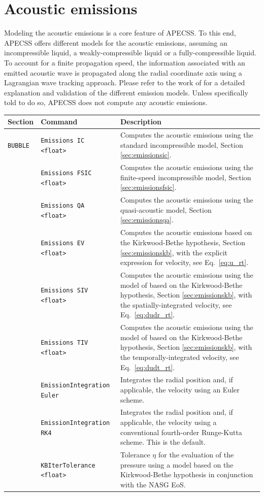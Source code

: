 \chapter{Acoustic emissions}

Modeling the acoustic emissions is a core feature of APECSS. To this end, APECSS offers different models for the acoustic emissions, assuming an incompressible liquid, a weakly-compressible liquid or a fully-compressible liquid. To account for a finite propagation speed, the information associated with an emitted acoustic wave is propagated along the radial coordinate axis using a Lagrangian wave tracking approach. Please refer to the work of \citet{Denner2023} for a detailed explanation and validation of the different emission models. Unless specifically told to do so, APECSS does not compute any acoustic emissions. 

\vspace{0.8em}

\noindent
\begin{tabular}{p{} p{} p{}}
    \textbf{Section} &\textbf{Command} & \textbf{Description} 
\vspace{1mm} \\ \hline
{\tt BUBBLE} & {\tt Emissions IC <float>} & Computes the acoustic emissions using the standard incompressible model, Section \ref{sec:emissionsic}.\\ 
& {\tt Emissions FSIC <float>} & Computes the acoustic emissions using the finite-speed incompressible model, Section \ref{sec:emissionsfsic}.\\ 
& {\tt Emissions QA <float>} & Computes the acoustic emissions using the quasi-acoustic model, Section \ref{sec:emissionsqa}.\\ 
& {\tt Emissions EV <float>} & Computes the acoustic emissions based on the Kirkwood-Bethe hypothesis, Section \ref{sec:emissionskb}, with the explicit expression for velocity, see Eq.~\eqref{eq:u_rt}.\\ 
& {\tt Emissions SIV <float>} & Computes the acoustic emissions using the model of \citet{Gilmore1952} based on the Kirkwood-Bethe hypothesis, Section \ref{sec:emissionskb}, with the spatially-integrated velocity, see Eq.~\eqref{eq:dudr_rt}.\\ 
& {\tt Emissions TIV <float>} & Computes the acoustic emissions using the model of \citet{Hickling1963} based on the Kirkwood-Bethe hypothesis, Section \ref{sec:emissionskb}, with the temporally-integrated velocity, see Eq.~\eqref{eq:dudt_rt}.\\ 
& {\tt EmissionIntegration Euler} & Integrates the radial position and, if applicable, the velocity using an Euler scheme.\\
& {\tt EmissionIntegration RK4} & Integrates the radial position and, if applicable, the velocity using a conventional fourth-order Runge-Kutta scheme. This is the default.\\
& {\tt KBIterTolerance <float>} & Tolerance $\eta$ for the evaluation of the pressure using a model based on the Kirkwood-Bethe hypothesis in conjunction with the NASG EoS.\\
 \hline
\end{tabular} \vspace{0.2em}

